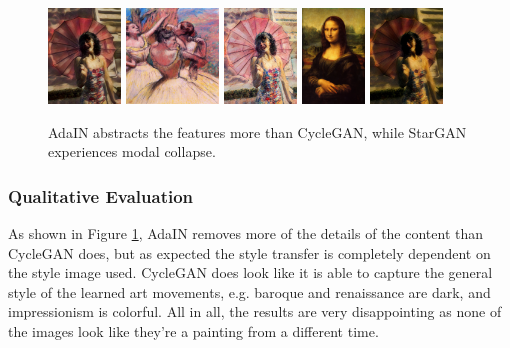 \documentclass[conference]{IEEEtran}
\begin{document}
\begin{figure}[t]
{		\includegraphics[height=1in]{000000000036_adain_baroque_a}
        \includegraphics[height=1in]{22_91_edgar-degas_three-dancers}
        \includegraphics[height=1in]{000000000036_adain_impressionism_a}
        \includegraphics[height=1in]{15_11_leonardo-da-vinci_mona-lisa}
        \includegraphics[height=1in]{000000000036_adain_renaissance_b}
    }
	\caption{AdaIN abstracts the features more than CycleGAN, while StarGAN experiences modal collapse.}
	\label{fig:difference_AdaIN_CycleGAN}
\end{figure}

\subsubsection{Qualitative Evaluation}
As shown in Figure \ref{fig:difference_AdaIN_CycleGAN}, AdaIN removes more of the details of the content than CycleGAN does, but as expected the style transfer is completely dependent on the style image used.
CycleGAN does look like it is able to capture the general style of the learned art movements, e.g. baroque and renaissance are dark, and impressionism is colorful.
All in all, the results are very disappointing as none of the images look like they're a painting from a different time.
\end{document}
